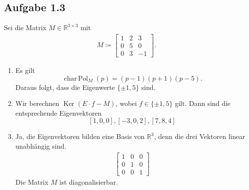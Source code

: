 \documentclass[draft,a5paper]{article}
\theoremstyle{remark}
\DeclareMathOperator{\Ker}{Ker}
\DeclareMathOperator{\charPol}{char\,Pol}
\begin{document}
\subsection*{Aufgabe 1.3}
Sei die Matrix \(M \in \mathbb{R}^{3 \times 3}\) mit
\begin{align*}
  M \coloneq
  \begin{bmatrix}
    1 & 2 & 3 \\
    0 & 5 & 0 \\
    0 & 3 & -1
  \end{bmatrix}.
\end{align*}
\begin{enumerate}
\item Es gilt \[\charPol_{M}(p) = (p-1)(p+1)(p-5).\]  Daraus folgt, dass
  die Eigenwerte \(\{\pm 1, 5\}\) sind.
\item Wir berechnen \(\Ker(E \cdot f - M)\), wobei \(f \in \{\pm 1, 5\}\) gilt.
  Dann sind die entsprechende Eigenvektoren
  \[[1, 0, 0], [-3, 0, 2], [7, 8, 4]\]
\item Ja, die Eigenvektoren bilden eine Basis von \(\mathbb{R}^{3}\), denn die
  drei Vektoren linear unabhängig sind.
  \begin{align*}
    \begin{bmatrix}
      1 & 0 & 0 \\
      0 & 1 & 0 \\
      0 & 0 & 1
    \end{bmatrix}
  \end{align*}
  Die Matrix \(M\) ist diagonalisierbar.
\end{enumerate}
\end{document}
